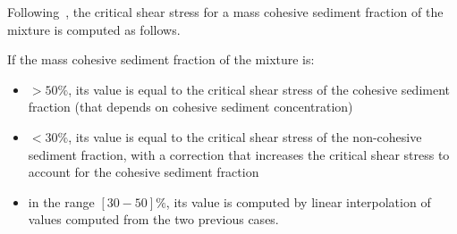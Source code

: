 \begin{enumerate}
%
\end{enumerate}



Following~\cite{LEHIR2011S135}, the critical shear stress for a mass cohesive sediment fraction of the mixture is computed as follows.

If the mass cohesive sediment fraction of the mixture is:
\begin{itemize}
\item $>50\%$, its value is equal to the critical shear stress of the cohesive sediment fraction (that depends on cohesive sediment concentration)
\item $<30\%$, its value is equal to the critical shear stress of the non-cohesive sediment fraction, with a correction that increases the critical shear stress to account for the cohesive sediment fraction
\item in the range $[30-50]\%$, its value is computed by linear interpolation of values computed from the two previous cases.
\end{itemize}


